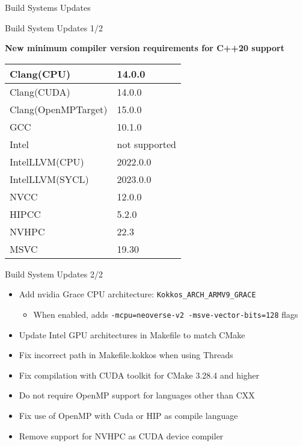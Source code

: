 

\begin{frame}[fragile]

  {\huge Build Systems Updates}
  \vspace{-10pt}
\end{frame}
  
\begin{frame}[fragile]{Build System Updates 1/2}

\textbf{New minimum compiler version requirements for C++20 support}

\begin{center}
\begin{tabular}{l|l}
  Clang(CPU)          & 14.0.0 \\ \hline
  Clang(CUDA)         & 14.0.0 \\ \hline
  Clang(OpenMPTarget) & 15.0.0 \\ \hline
  GCC                 & 10.1.0 \\ \hline
  Intel               & not supported \\ \hline
  IntelLLVM(CPU)      & 2022.0.0 \\ \hline
  IntelLLVM(SYCL)     & 2023.0.0 \\ \hline
  NVCC                & 12.0.0 \\ \hline
  HIPCC               & 5.2.0 \\ \hline
  NVHPC               & 22.3 \\ \hline
  MSVC                & 19.30
\end{tabular}
\vspace{-10pt}
\end{center}
\end{frame}


\begin{frame}[fragile]{Build System Updates 2/2}

\begin{itemize}
\item Add nvidia Grace CPU architecture: \texttt{Kokkos\_ARCH\_ARMV9\_GRACE}  
  \begin{itemize}
    \item[] When enabled, adds \texttt{-mcpu=neoverse-v2 -msve-vector-bits=128} flags
  \end{itemize}

\item Update Intel GPU architectures in Makefile to match CMake
\item Fix incorrect path in Makefile.kokkos when using Threads
\item Fix compilation with CUDA toolkit for CMake 3.28.4 and higher
\item Do not require OpenMP support for languages other than CXX
\item Fix use of OpenMP with Cuda or HIP as compile language
\item Remove support for NVHPC as CUDA device compiler
\end{itemize}

\end{frame}
